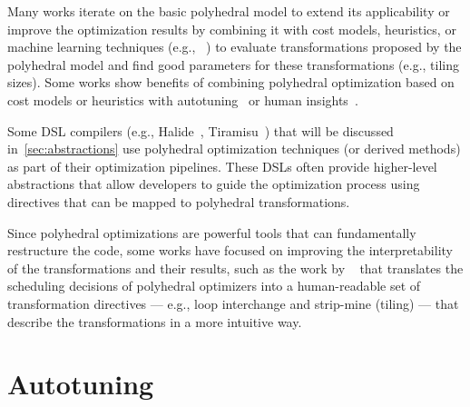 Many works iterate on the basic polyhedral model to extend its applicability or improve the optimization results by combining it with cost models, heuristics, or machine learning techniques (e.g., \citeauthor{baghdadi2021deep}~\cite{baghdadi2021deep}) to evaluate transformations proposed by the polyhedral model and find good parameters for these transformations (e.g., tiling sizes). Some works show benefits of combining polyhedral optimization based on cost models or heuristics with autotuning~\cite{chelini2020automatic} or human insights~\cite{zinenko2014clint,bagneres2016opening}.

Some DSL compilers (e.g., Halide~\cite{ragan2013halide}, Tiramisu~\cite{baghdadi2019tiramisu}) that will be discussed in~\cref{sec:abstractions} use polyhedral optimization techniques (or derived methods) as part of their optimization pipelines. These DSLs often provide higher-level abstractions that allow developers to guide the optimization process using directives that can be mapped to polyhedral transformations.


Since polyhedral optimizations are powerful tools that can fundamentally restructure the code, some works have focused on improving the interpretability of the transformations and their results, such as the work by \citeauthor{bagneres2016opening}~\cite{bagneres2016opening} that translates the scheduling decisions of polyhedral optimizers into a human-readable set of transformation directives --- e.g., loop interchange and strip-mine (tiling) --- that describe the transformations in a more intuitive way.


\section{Autotuning}\label{sec:autotuning}

